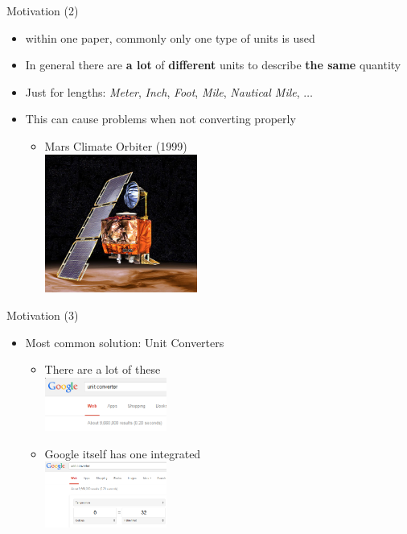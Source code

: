 \documentclass{beamer}
\begin{document}
  \begin{frame}{Motivation (2)}
    \begin{itemize}[<+->]
      \item within one paper, commonly only one type of units is used
      \item In general there are \textbf{a lot} of \textbf{different} units to describe \textbf{the same} quantity
      \item Just for lengths: \pause \textit{Meter}, \pause \textit{Inch}, \pause \textit{Foot}, \pause \textit{Mile}, \pause \textit{Nautical Mile}, \pause $\dots$
      \item This can cause problems when not converting properly
      \begin{itemize}
        \item Mars Climate Orbiter (1999) \\ \includegraphics[width=50mm]{imgs/mco.jpg}
      \end{itemize}
    \end{itemize}
  \end{frame}

  \begin{frame}{Motivation (3)}
    \pause
    \begin{itemize}[<+->]
      \item Most common solution: Unit Converters
      \begin{itemize}[<+->]
        \item There are a lot of these \\ \includegraphics[width=40mm]{imgs/google.png}
        \item Google itself has one integrated \\ \includegraphics[width=40mm]{imgs/googleuc.png}
      \end{itemize}
    \end{itemize}
  \end{frame}
\end{document}
